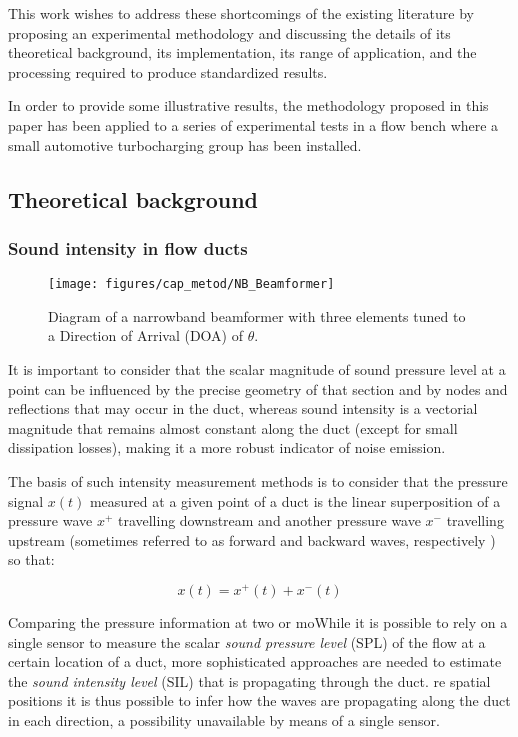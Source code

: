 This work wishes to address these shortcomings of the existing literature by proposing an experimental methodology and discussing the details of its theoretical background, its implementation, its range of application, and the  processing required to produce standardized results.

In order to provide some illustrative results, the methodology proposed in this paper has been applied to a series of experimental tests in a flow bench where a small automotive turbocharging group has been installed.

\subsection{Theoretical background}
\label{sec:theory}

\subsubsection{Sound intensity in flow ducts}
\label{sub:sound_intensity_in_flow_ducts}

\begin{figure}[h!]
\centering
\texttt{[image: figures/cap\_metod/NB\_Beamformer]}
\caption{Diagram of a narrowband beamformer with three elements tuned to a Direction of Arrival (DOA) of $\theta$.}
\label{fig:schematic}
\end{figure}


It is important to consider that the scalar magnitude of sound pressure level at a point can be influenced by the precise geometry of that section and by nodes and reflections that may occur in the duct, whereas sound intensity is a vectorial magnitude that remains almost constant along the duct (except for small dissipation losses), making it a more robust indicator of noise emission.

The basis of such intensity measurement methods is to consider that the pressure signal $x(t)$ measured at a given point of a duct is the linear superposition of a pressure wave $x^+$ travelling downstream and another pressure wave $x^-$ travelling upstream (sometimes referred to as forward and backward waves, respectively \cite{pinero2000estimation}) so that:

\begin{equation}
  x(t)=x^+(t)+x^-(t)
\end{equation}

Comparing the pressure information at two or moWhile it is possible \cite{figurella2012noise} to rely on a single sensor to measure the scalar \emph{sound pressure level} (SPL) of the flow at a certain location of a duct, more sophisticated approaches are needed to estimate the \emph{sound intensity level} (SIL) that is propagating through the duct.
re spatial positions it is thus possible to infer how the waves are propagating along the duct in each direction, a possibility unavailable by means of a single sensor.

